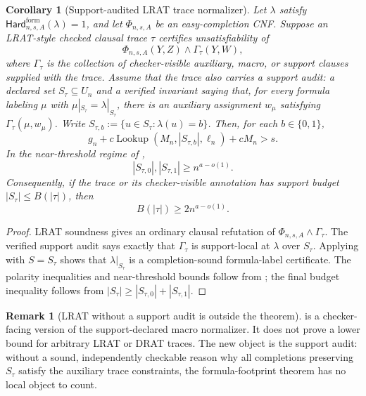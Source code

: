 \documentclass[11pt]{article}
\newtheorem{corollary}[theorem]{Corollary}
\theoremstyle{definition}
\newtheorem{remark}[theorem]{Remark}
\newcommand{\bits}{\{0,1\}}
\newcommand{\Lookup}{\operatorname{Lookup}}
\newcommand{\HardF}{\mathsf{Hard}^{\mathrm{form}}}
\begin{document}
\begin{corollary}[Support-audited LRAT trace normalizer]\label{cor:support-audited-lrat}
Let \(\lambda\) satisfy \(\HardF_{n,s,A}(\lambda)=1\), and let \(\Phi_{n,s,A}\) be an easy-completion CNF.  Suppose an LRAT-style checked clausal trace \(\tau\) certifies unsatisfiability of
\[
  \Phi_{n,s,A}(Y,Z)\wedge\Gamma_\tau(Y,W),
\]
where \(\Gamma_\tau\) is the collection of checker-visible auxiliary, macro, or support clauses supplied with the trace.  Assume that the trace also carries a support audit: a declared set \(S_\tau\subseteq U_n\) and a verified invariant saying that, for every formula labeling \(\mu\) with \(\mu|_{S_\tau}=\lambda|_{S_\tau}\), there is an auxiliary assignment \(w_\mu\) satisfying \(\Gamma_\tau(\mu,w_\mu)\).  Write \(S_{\tau,b}:=\{u\in S_\tau:\lambda(u)=b\}\).  Then, for each \(b\in\bits\),
\[
  g_n+c\Lookup(M_n,|S_{\tau,b}|,\ell_n)+cM_n>s.
\]
In the near-threshold regime of ,
\[
  |S_{\tau,0}|,|S_{\tau,1}|\ge n^{a-o(1)}.
\]
Consequently, if the trace or its checker-visible annotation has support budget \(|S_\tau|\le B(|\tau|)\), then
\[
  B(|\tau|)\ge 2n^{a-o(1)}.
\]
\end{corollary}

\begin{proof}
LRAT soundness gives an ordinary clausal refutation of \(\Phi_{n,s,A}\wedge\Gamma_\tau\).  The verified support audit says exactly that \(\Gamma_\tau\) is support-local at \(\lambda\) over \(S_\tau\).  Applying  with \(S=S_\tau\) shows that \(\lambda|_{S_\tau}\) is a completion-sound formula-label certificate.  The polarity inequalities and near-threshold bounds follow from ; the final budget inequality follows from \(|S_\tau|\ge |S_{\tau,0}|+|S_{\tau,1}|\).
\end{proof}

\begin{remark}[LRAT without a support audit is outside the theorem]\label{rem:support-audited-lrat-scope}
 is a checker-facing version of the support-declared macro normalizer.  It does not prove a lower bound for arbitrary LRAT or DRAT traces.  The new object is the support audit: without a sound, independently checkable reason why all completions preserving \(S_\tau\) satisfy the auxiliary trace constraints, the formula-footprint theorem has no local object to count.
\end{remark}
\end{document}
